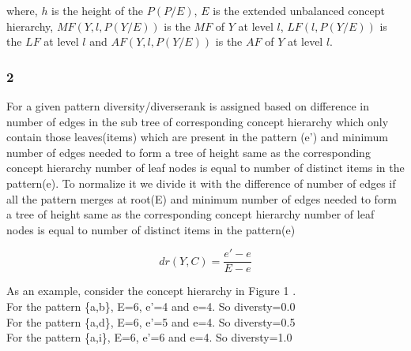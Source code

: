 where, $h$ is the height of the $P (P/E)$, $E$ is the extended unbalanced concept hierarchy, $MF (Y, l, P (Y /E))$ is the $MF$ 
of $Y$ at level $l$, $LF (l, P (Y /E))$ is the $LF$ at level $l$ and $AF (Y, l, P (Y /E))$ is the $AF$ of $Y$ at level $l$.

\subsubsection{2}
For a given pattern diversity/diverserank is assigned based on difference in number of edges in the sub tree of corresponding concept hierarchy which only contain those leaves(items) which are present in the pattern (e') and minimum number of edges needed to form a tree of height same as the corresponding concept hierarchy  number of leaf nodes is equal to number of distinct items in the pattern(e). 
To normalize it we divide it with the difference of number of edges if all the pattern merges at root(E) and  minimum number of edges needed to form a tree of height same as the     corresponding concept hierarchy  number of leaf nodes is equal to number of distinct items in the pattern(e)

\begin{equation}\label{eq:2}
    dr(Y,C)=\frac{e'-e}{E-e}
\end{equation}

As an example, consider the concept hierarchy in Figure 1 \iffalse(figure number)\fi. \\ 
For the pattern \{a,b\}, E=6, e'=4 and e=4. So diversty=0.0 \\
For the pattern \{a,d\}, E=6, e'=5 and e=4. So diversty=0.5 \\
For the pattern \{a,i\}, E=6, e'=6 and e=4. So diversty=1.0
